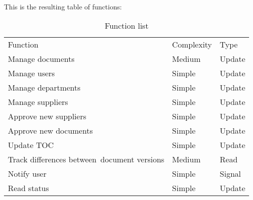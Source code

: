 This is the resulting table of functions:
\begin{table}[H]
\centering
\begin{tabular}{lll}
Function                                    & Complexity & Type    \\
Manage documents                            & Medium     & Update  \\
Manage users                                & Simple     & Update  \\
Manage departments                          & Simple     & Update  \\
Manage suppliers                            & Simple     & Update  \\
Approve new suppliers                       & Simple     & Update  \\
Approve new documents                       & Simple     & Update  \\
Update TOC                                  & Simple     & Update  \\
Track differences between~document versions & Medium     & Read    \\
Notify user                                 & Simple     & Signal  \\
Read status                                 & Simple     & Update
\end{tabular}
\caption{Function list}
\end{table}




